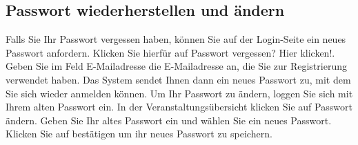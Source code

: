 \documentclass{Handbuch}
\begin{document}
\subsection{Passwort wiederherstellen und ändern}
Falls Sie Ihr Passwort vergessen haben, können Sie auf der Login-Seite ein neues Passwort anfordern. Klicken Sie hierfür auf \frqq Passwort vergessen? Hier klicken!\flqq. Geben Sie im Feld \glqq E-Mailadresse\grqq{} die E-Mailadresse an, die Sie zur Registrierung verwendet haben. Das System sendet Ihnen dann ein neues Passwort zu, mit dem Sie sich wieder anmelden können. 
Um Ihr Passwort zu ändern, loggen Sie sich mit Ihrem alten Passwort ein. In der Veranstaltungsübersicht klicken Sie auf \frqq Passwort ändern\flqq. Geben Sie Ihr altes Passwort ein und wählen Sie ein neues Passwort. Klicken Sie auf \frqq bestätigen\flqq{} um ihr neues Passwort zu speichern.
\end{document}
